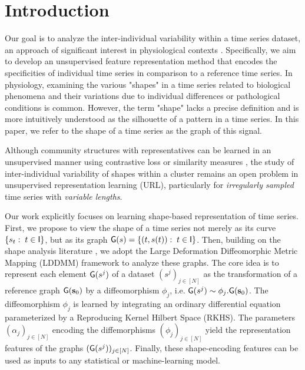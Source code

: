 \vspace{-1ex}
\section{Introduction}
\vspace{-1ex}

Our goal is to analyze the inter-individual variability within a time series dataset, an approach of significant interest in physiological contexts \cite{guscelli2019importance, wang2016research, bar2012studying, germain2023unsupervised}. Specifically, we aim to develop an unsupervised feature representation method that encodes the specificities of individual time series in comparison to a reference time series. In physiology, examining the various "shapes" in a time series related to biological phenomena and their variations due to individual differences or pathological conditions is common. However, the term "shape" lacks a precise definition and is more intuitively understood as the silhouette of a pattern in a time series. In this paper, we refer to the shape of a time series as the graph of this signal.

Although community structures with representatives can be learned in an unsupervised manner \cite{trirat2024universal, meng2023unsupervised} using contrastive loss \cite{franceschi2019unsupervised, tonekaboni2021unsupervised, meng2023unsupervised} or similarity measures \cite{asgari2023clustering, germain2023unsupervised, paparrizos2015k, ye2009time}, the study of inter-individual variability of shapes within a cluster \cite{niennattrakul2007inaccuracies, shirato2023identifying} remains an open problem in unsupervised representation learning (URL), particularly for \textit{irregularly sampled} time series with \textit{variable lengths}.
   
Our work explicitly focuses on learning shape-based representation of time series. First, we propose to view the shape of a time series not merely as its curve $\{s_t:\; t\in\mathsf{I}\}$, but as its graph $\mathsf{G}(s)=\{(t,s(t)):\; t\in \mathsf{I}\}$. Then, building on the shape analysis literature \cite{beg2005computing,vaillant2004statistics}, we adopt the Large Deformation Diffeomorphic Metric Mapping (LDDMM) framework \cite{beg2005computing,vaillant2004statistics} to analyze these graphs. The core idea is to represent each element $\mathsf{G}(s^j)$ of a dataset $(s^j)_{j\in[N]}$ as the transformation of a reference graph $\mathsf{G}(\mathbf{s}_0)$ by a diffeomorphism $\phi_j$, i.e. $\mathsf{G}(s^j) \sim \phi_j . \mathsf{G}(\mathbf{s}_0)$. The diffeomorphism $\phi_j$ is learned by integrating an ordinary differential equation parameterized by a Reproducing Kernel Hilbert Space (RKHS). The parameters $(\alpha_j)_{j\in[N]}$ encoding the diffemorphisms $(\phi_j)_{j\in[N]}$ yield the representation features of the graphs $(\mathsf{G}(s^j))_{j\in[N]}$. Finally, these shape-encoding features can be used as inputs to any statistical or machine-learning model.

